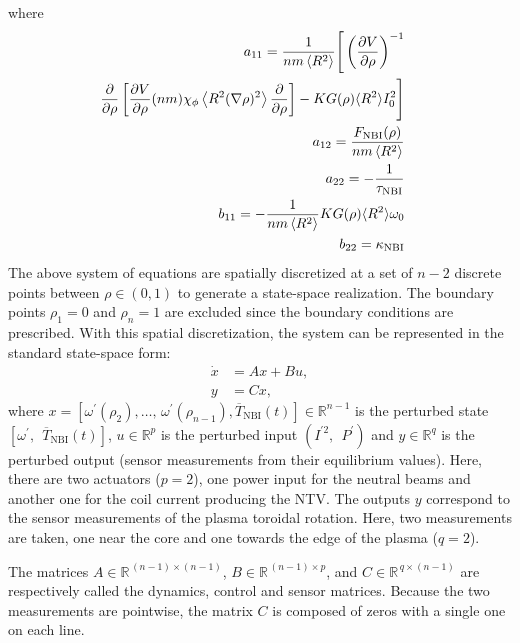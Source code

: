\documentclass{iopart}
\begin{document}
 where
 \begin{eqnarray}
 a_{11} =  \frac{1}{n m \left<R^2\right>} \Bigg[ \left( \frac{\partial V}{\partial\rho}\right)^{-1} \nonumber \\
   \hspace{-1em}\frac{\partial}{\partial \rho} 
   \left[\frac{\partial V}{\partial \rho}(n m)\chi_\phi 
   \left< R^2 (\nabla \rho)^2\right> 
   \frac{\partial}{\partial\rho}\right]-K G(\rho) \langle R^2 \rangle  I^2_0 \Bigg]  \nonumber \\
 a_{12} =  \frac{ F_\text{NBI}(\rho) }{n m \left<R^2\right>}\nonumber \\
 a_{22} = - \frac{1}{\tau_\text{NBI}}  \nonumber \\  
 b_{11} = - \frac{1}{n m \left<R^2\right>} K G(\rho) \langle R^2 \rangle  \omega_0 \nonumber \\
 b_{22} = \kappa_\text{NBI} \nonumber
 \end{eqnarray}
 The above system of equations are spatially discretized at a set of $n-2$ discrete points between $\rho \in (0,1)$ to generate a state-space realization. The boundary points $\rho_1 = 0$ and $\rho_n =1$ are excluded since the boundary conditions are prescribed. With this spatial discretization, the system can be represented in the standard state-space form:
\begin{align}
	\dot{x} &= A x + B u, \label{eqn:state-space1} \\
	y &= C x, \label{eqn:state-space2} 
\end{align}
where $x = [  \omega^{'}(\rho_2),\ldots,\,\omega^{'}(\rho_{n-1}), \overline{T}_\text{NBI}(t)     ] \in \mathbb{R}^{n-1}$ is the perturbed state $  \left[ \omega^{'} , \ \ \overline{T}_\text{NBI}(t)  \right]$, $u \in \mathbb{R}^p$ is the perturbed input $\left( I^{'2}, \ \  P^{'} \right)$ and $y \in \mathbb{R}^q$ is the perturbed output (sensor measurements from their equilibrium values).
Here, there are two actuators ($p=2$), one power input for the neutral beams and another one for the coil current producing the NTV.
The outputs $y$ correspond to the sensor measurements of the plasma toroidal rotation. Here, two measurements are taken, one near the core and one towards the edge of the plasma ($q=2$).

The matrices $A \in \mathbb{R}^{\, (n-1) \times (n-1)}$, $B \in \mathbb{R}^{\,(n-1) \times p}$, and $C \in \mathbb{R}^{\, q \times (n-1)}$ are respectively called the dynamics, control and sensor matrices.
Because the two measurements are pointwise, the matrix $C$ is composed of zeros with a single one on each line.
\end{document}
